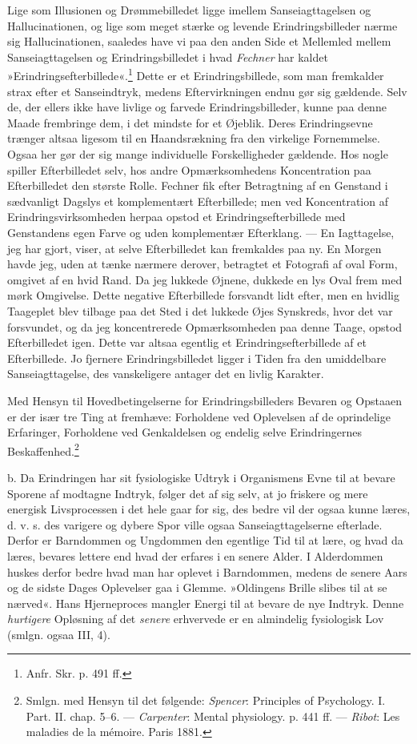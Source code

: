 \documentclass[12pt,a4paper,openany]{book}
\newcommand{\opage}[1]{\marginnote{\footnotesize\textit{[#1]}}}
\begin{document}
Lige som Illusionen og Drømmebilledet ligge imellem Sanseiagttagelsen og
Hallucinationen, og lige som meget stærke
\opage{180}og levende Erindringsbilleder nærme sig Hallucinationen,
saaledes have vi paa den anden Side et Mellemled mellem
Sanseiagttagelsen og Erindringsbilledet i hvad \emph{Fechner} har kaldet
»Erindringsefterbillede«.\footnote[1]{Anfr. Skr. p. 491 ff.} Dette er et
Erindringsbillede, som man fremkalder strax efter et Sanseindtryk,
medens Eftervirkningen endnu gør sig gældende. Selv de, der ellers ikke
have livlige og farvede Erindringsbilleder, kunne paa denne Maade
frembringe dem, i det mindste for et Øjeblik. Deres Erindringsevne
trænger altsaa ligesom til en Haandsrækning fra den virkelige
Fornemmelse. Ogsaa her gør der sig mange individuelle Forskelligheder
gældende. Hos nogle spiller Efterbilledet selv, hos andre
Opmærksomhedens Koncentration paa Efterbilledet den største Rolle.
Fechner fik efter Betragtning af en Genstand i sædvanligt Dagslys et
komplementært Efterbillede; men ved Koncentration af
Erindringsvirksomheden herpaa opstod et Erindringsefterbillede med
Genstandens egen Farve og uden komplementær Efterklang. --- En
Iagttagelse, jeg har gjort, viser, at selve Efterbilledet kan fremkaldes
paa ny. En Morgen havde jeg, uden at tænke nærmere derover, betragtet et
Fotografi af oval Form, omgivet af en hvid Rand. Da jeg lukkede Øjnene,
dukkede en lys Oval frem med mørk Omgivelse. Dette negative Efterbillede
forsvandt lidt efter, men en hvidlig Taageplet blev tilbage paa det Sted
i det lukkede Øjes Synskreds, hvor det var forsvundet, og da jeg
koncentrerede Opmærksomheden paa denne Taage, opstod Efterbilledet igen.
Dette var altsaa egentlig et Erindringsefterbillede af et Efterbillede.
Jo fjernere Erindringsbilledet ligger i Tiden fra den umiddelbare
Sanseiagttagelse, des vanskeligere antager det en livlig Karakter.

Med Hensyn til Hovedbetingelserne for Erindringsbilleders Bevaren og
Opstaaen er der især tre Ting at fremhæve: Forholdene ved Oplevelsen af
de oprindelige Erfaringer, Forholdene ved Genkaldelsen og endelig selve
Erindringernes Beskaffenhed.\footnote[2]{Smlgn. med Hensyn til det
følgende: \emph{Spencer}: Principles of Psychology. I. Part. II. chap.
5--6. --- \emph{Carpenter}: Mental physiology. p. 441 ff. ---
\emph{Ribot}: Les maladies de la mémoire. Paris 1881.}


\opage{181}b. Da Erindringen har sit fysiologiske Udtryk i Organismens
Evne til at bevare Sporene af modtagne Indtryk, følger det af sig selv,
at jo friskere og mere energisk Livsprocessen i det hele gaar for sig,
des bedre vil der ogsaa kunne læres, d. v. s. des varigere og dybere
Spor ville ogsaa Sanseiagttagelserne efterlade. Derfor er Barndommen og
Ungdommen den egentlige Tid til at lære, og hvad da læres, bevares
lettere end hvad der erfares i en senere Alder. I Alderdommen huskes
derfor bedre hvad man har oplevet i Barndommen, medens de senere Aars og
de sidste Dages Oplevelser gaa i Glemme. »Oldingens Brille slibes til at
se nærved«. Hans Hjerneproces mangler Energi til at bevare de nye
Indtryk. Denne \emph{hurtigere} Opløsning af det \emph{senere}
erhvervede er en almindelig fysiologisk Lov (smlgn. ogsaa III, 4).
\end{document}
